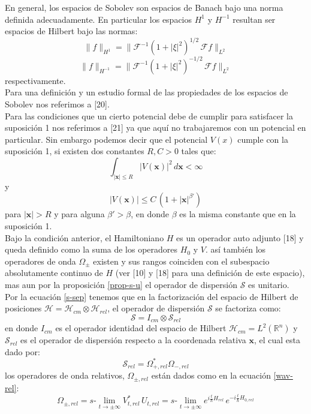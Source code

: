 \documentclass[12pt]{book}
\numberwithin{equation}{chapter}
\def\R{\mathbb{R}}
\def\S{\mathcal{S}}
\def\rar{\rightarrow}
\def\H{\mathcal{H}}
\def\F{\mathcal{F}}
\def\pr{\otimes}
\def\x{\mathbf{x}}
\def\O{\Omega}
\def\slim{s\mbox{-}\lim}
\begin{document}
En general, los espacios de Sobolev son espacios de Banach bajo una norma definida adecuadamente. En particular los espacios $H^{1}$ y $H^{-1}$ resultan ser espacios de Hilbert bajo las normas:
$$ \| f \|_{H^{1}} = \| \F^{-1} (1+|\xi|^{2} )^{1/2} \, \F f \|_{L^{2}} $$
$$ \| f \|_{H^{-1}} = \| \F^{-1} (1+|\xi|^{2} )^{-1/2} \, \F f \|_{L^{2}} $$
respectivamente.\\

Para una definici\'on y un estudio formal de las propiedades de los espacios de Sobolev nos referimos a [20]. \\

Para las condiciones que un cierto potencial debe de cumplir para satisfacer la suposici\'on 1 nos referimos a [21] ya que aqu\'i no trabajaremos con un potencial en particular. Sin embargo podemos decir que el potencial $V(x)$ cumple con la suposici\'on 1, si existen dos constantes $R, C > 0 $ tales que:
$$ \int_{|\x| \leq R} |V(\x)|^{2} \, d\x < \infty $$
y
$$ |V(\x)| \leq C\, (1+|\x|^{\beta'}) $$
para $|\x| > R$ y para alguna $\beta' >\beta$, en donde $\beta$ es la misma constante que en la suposici\'on 1.\\

Bajo la condici\'on anterior, el Hamiltoniano $H$ es un operador auto adjunto [18] y queda definido como la suma de los operadores $H_{0}$ y $V$. as\'i tambi\'en los operadores de onda $\O_{\pm}$ existen y sus rangos coinciden con el subespacio absolutamente continuo de $H$ (ver [10] y [18] para una definici\'on de este espacio), mas aun por la proposici\'on \ref{prop-s-u} el operador de dispersi\'on $\S$ es unitario.\\

Por la ecuaci\'on \eqref{s-sep} tenemos que en la factorizaci\'on del espacio de Hilbert de posiciones $\H= \H_{cm} \pr \H_{rel}$, el operador de dispersi\'on $\S$ se factoriza como:
$$ \S = I_{cm} \pr \S_{rel} $$
en donde $I_{cm}$ es el operador identidad del espacio de Hilbert $\H_{cm}= L^{2}(\R^{n})$ y $\S_{rel}$ es el operador de dispersi\'on respecto a la coordenada relativa $\x$, el cual esta dado por:
$$\S_{rel} = \O_{+,rel}^{*} \O_{-,rel} $$
los operadores de onda relativos, $\O_{\pm,rel}$ est\'an dados como en la ecuaci\'on \eqref{wav-rel}:
$$ \O_{\pm,rel}= \slim_{t \rar \pm \infty} V_{t,rel}^{*} \, U_{t,rel}=\slim_{t \rar \pm \infty} e^{i\frac{t}{\hbar}H_{rel} }\, e^{-i\frac{t}{\hbar}H_{0,rel} } $$
\end{document}

